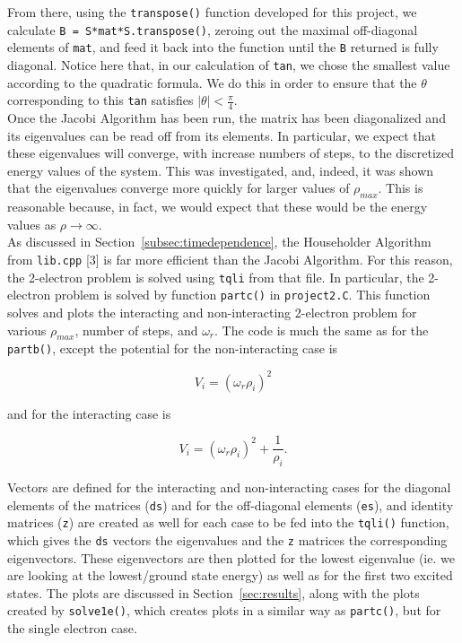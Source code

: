 \documentclass[12pt]{article}
\numberwithin{equation}{section}
\begin{document}
\noindent From there, using the \texttt{transpose()} function developed for this project, we calculate \texttt{B = S*mat*S.transpose()}, zeroing out the maximal off-diagonal elements of \texttt{mat}, and feed it back into the function until the \texttt{B} returned is fully diagonal.  Notice here that, in our calculation of \texttt{tan}, we chose the smallest value according to the quadratic formula.  We do this in order to ensure that the $\theta$ corresponding to this \texttt{tan} satisfies $|\theta|<\frac{\pi}{4}$.  
\\\indent Once the Jacobi Algorithm has been run, the matrix has been diagonalized and its eigenvalues can be read off from its elements.  In particular, we expect that these eigenvalues will converge, with increase numbers of steps, to the discretized energy values of the system.  This was investigated, and, indeed, it was shown that the eigenvalues converge more quickly for larger values of $\rho_{max}$.  This is reasonable because, in fact, we would expect that these would be the energy values as $\rho\rightarrow\infty$.
\\\indent As discussed in Section~\ref{subsec:timedependence}, the Householder Algorithm from \texttt{lib.cpp} [3] is far more efficient than the Jacobi Algorithm.  For this reason, the 2-electron problem is solved using \texttt{tqli} from that file.  In particular, the 2-electron problem is solved by function \texttt{partc()} in \texttt{project2.C}.  This function solves and plots the interacting and non-interacting 2-electron problem for various $\rho_{max}$, number of steps, and $\omega_r$.  The code is much the same as for the \texttt{partb()}, except the potential for the non-interacting case is 

$$V_i = \left(\omega_{r}\rho_{i}\right)^{2}$$

\noindent and for the interacting case is

$$V_{i} = \left(\omega_{r}\rho_{i}\right)^{2}+\frac{1}{\rho_{i}}.$$

\noindent Vectors are defined for the interacting and non-interacting cases for the diagonal elements of the matrices (\texttt{ds}) and for the off-diagonal elements (\texttt{es}), and identity matrices (\texttt{z}) are created as well for each case to be fed into the \texttt{tqli()} function, which gives the \texttt{ds} vectors the eigenvalues and the \texttt{z} matrices the corresponding eigenvectors.  These eigenvectors are then plotted for the lowest eigenvalue (ie. we are looking at the lowest/ground state energy) as well as for the first two excited states.  The plots are discussed in Section~\ref{sec:results}, along with the plots created by \texttt{solve1e()}, which creates plots in a similar way as \texttt{partc()}, but for the single electron case.
\end{document}
